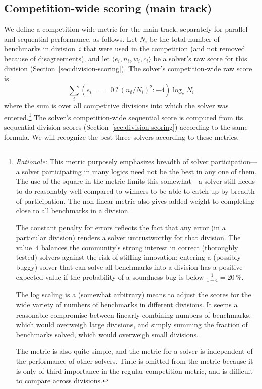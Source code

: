 \documentclass[12pt]{article}
\begin{document}
\subsection{Competition-wide scoring (main track)}
\label{sec:competition-wide}

We define a competition-wide metric for the main track, separately for
parallel and sequential performance, as follows.  Let $N_i$ be the
total number of benchmarks in division~$i$ that were used in the
competition (and not removed because of disagreements), and let
$\langle e_i, n_i, w_i, c_i\rangle$ be a solver's raw score for this
division (Section~\ref{sec:division-scoring}).  The solver's
competition-wide raw score is
%
$$\sum_i (e_i == 0 \,?\, (n_i/N_i)^2 : -4) \log_e N_i$$
%
where the sum is over all competitive divisions into which the solver
was entered.\footnote{\emph{Rationale:} This metric purposely
  emphasizes breadth of solver participation---a solver participating
  in many logics need not be the best in any one of them.  The use of
  the square in the metric limits this somewhat---a solver still needs
  to do reasonably well compared to winners to be able to catch up by
  breadth of participation.  The non-linear metric also gives added
  weight to completing close to all benchmarks in a division.

  The constant penalty for errors reflects the fact that any error (in
  a particular division) renders a solver untrustworthy for that
  division.  The value~$4$ balances the community's strong interest in
  correct (thoroughly tested) solvers against the risk of stifling
  innovation: entering a (possibly buggy) solver that can solve all
  benchmarks into a division has a positive expected value if the
  probability of a soundness bug is below $\frac{1}{1+4} = 20$\,\%.
  
  The log scaling is a (somewhat arbitrary) means to adjust the scores
  for the wide variety of numbers of benchmarks in different
  divisions.  It seems a reasonable compromise between linearly
  combining numbers of benchmarks, which would overweigh large
  divisions, and simply summing the fraction of benchmarks solved,
  which would overweigh small divisions.

  The metric is also quite simple, and the metric for a solver is
  independent of the performance of other solvers.  Time is omitted
  from the metric because it is only of third importance in the
  regular competition metric, and is difficult to compare across
  divisions.}  The solver's competition-wide sequential score is
computed from its sequential division scores
(Section~\ref{sec:division-scoring}) according to the same formula.
We will recognize the best three solvers according to these metrics.
\end{document}
